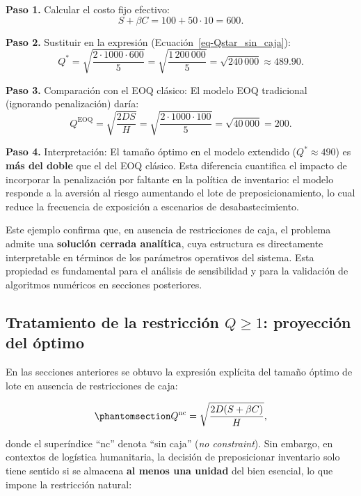 \documentclass[
  spanish,
  us-letterpaper,
]{scrreprt}
\numberwithin{equation}{section}
\begin{document}
\textbf{Paso 1.} Calcular el costo fijo efectivo: \[
S + \beta C = 100 + 50 \cdot 10 = 600.
\]

\textbf{Paso 2.} Sustituir en la expresión
(Ecuación~\ref{eq-Qstar_sin_caja}): \[
Q^* = \sqrt{\frac{2 \cdot 1000 \cdot 600}{5}} = \sqrt{\frac{1\,200\,000}{5}} = \sqrt{240\,000} \approx 489.90.
\]

\textbf{Paso 3.} Comparación con el EOQ clásico: El modelo EOQ
tradicional (ignorando penalización) daría: \[
Q^{\text{EOQ}} = \sqrt{\frac{2 D S}{H}} = \sqrt{\frac{2 \cdot 1000 \cdot 100}{5}} = \sqrt{40\,000} = 200.
\]

\textbf{Paso 4.} Interpretación: El tamaño óptimo en el modelo extendido
(\(Q^* \approx 490\)) es \textbf{más del doble} que el del EOQ clásico.
Esta diferencia cuantifica el impacto de incorporar la penalización por
faltante en la política de inventario: el modelo responde a la aversión
al riesgo aumentando el lote de preposicionamiento, lo cual reduce la
frecuencia de exposición a escenarios de desabastecimiento.

Este ejemplo confirma que, en ausencia de restricciones de caja, el
problema admite una \textbf{solución cerrada analítica}, cuya estructura
es directamente interpretable en términos de los parámetros operativos
del sistema. Esta propiedad es fundamental para el análisis de
sensibilidad y para la validación de algoritmos numéricos en secciones
posteriores.

\subsection{\texorpdfstring{Tratamiento de la restricción \(Q \geq 1\):
proyección del
óptimo}{Tratamiento de la restricción Q \textbackslash geq 1: proyección del óptimo}}\label{tratamiento-de-la-restricciuxf3n-q-geq-1-proyecciuxf3n-del-uxf3ptimo}

En las secciones anteriores se obtuvo la expresión explícita del tamaño
óptimo de lote en ausencia de restricciones de caja:

\begin{equation}\phantomsection\label{eq-Qstar_sin_caja_26_4}{
Q^{\text{nc}} = \sqrt{\frac{2 D (S + \beta C)}{H}},
}\end{equation}

donde el superíndice ``nc'' denota ``sin caja'' (\emph{no constraint}).
Sin embargo, en contextos de logística humanitaria, la decisión de
preposicionar inventario solo tiene sentido si se almacena \textbf{al
menos una unidad} del bien esencial, lo que impone la restricción
natural:
\end{document}
